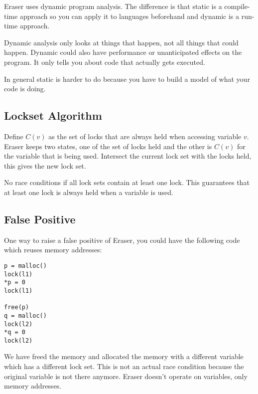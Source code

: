 \documentclass[psamsfonts]{amsart}
\begin{document}
Eraser uses dynamic program analysis. The difference is that static is a compile-time approach so you can apply it to languages beforehand and dynamic is a run-time approach.

Dynamic analysis only looks at things that happen, not all things that could happen. Dynamic could also have performance or unanticipated effects on the program. It only tells you about code that actually gets executed.

In general static is harder to do because you have to build a model of what your code is doing.

\subsection{Lockset Algorithm}

Define $C(v)$ as the set of locks that are always held when accessing variable $v$. Eraser keeps two states, one of the set of locks held and the other is $C(v)$ for the variable that is being used. Intersect the current lock set with the locks held, this gives the new lock set.

No race conditions if all lock sets contain at least one lock. This guarantees that at least one lock is always held when a variable is used.

\subsection{False Positive}

One way to raise a false positive of Eraser, you could have the following code which reuses memory addresses:

\begin{verbatim}
p = malloc()
lock(l1)
*p = 0
lock(l1)

free(p)
q = malloc()
lock(l2)
*q = 0
lock(l2)
\end{verbatim}

We have freed the memory and allocated the memory with a different variable which has a different lock set. This is not an actual race condition because the original variable is not there anymore. Eraser doesn't operate on variables, only memory addresses.
\end{document}

